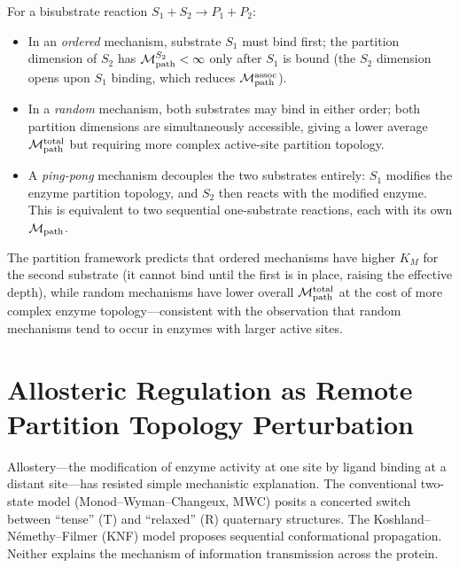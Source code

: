 \begin{proposition}
\label{prop:bibi}
For a bisubstrate reaction $S_1 + S_2 \to P_1 + P_2$:
\begin{itemize}
  \item In an \emph{ordered} mechanism, substrate $S_1$ must bind first;
        the partition dimension of $S_2$ has $\mathcal{M}_{\mathrm{path}}^{S_2} < \infty$
        only after $S_1$ is bound (the $S_2$ dimension opens upon $S_1$
        binding, which reduces $\mathcal{M}_{\mathrm{path}}^{\mathrm{assoc}}$).
  \item In a \emph{random} mechanism, both substrates may bind in either order;
        both partition dimensions are simultaneously accessible, giving a
        lower average $\mathcal{M}_{\mathrm{path}}^{\mathrm{total}}$ but requiring
        more complex active-site partition topology.
  \item A \emph{ping-pong} mechanism decouples the two substrates entirely:
        $S_1$ modifies the enzyme partition topology, and $S_2$ then reacts
        with the modified enzyme. This is equivalent to two sequential
        one-substrate reactions, each with its own $\mathcal{M}_{\mathrm{path}}$.
\end{itemize}
\end{proposition}

The partition framework predicts that ordered mechanisms have higher
$K_M$ for the second substrate (it cannot bind until the first is in place,
raising the effective depth), while random mechanisms have lower overall
$\mathcal{M}_{\mathrm{path}}^{\mathrm{total}}$ at the cost of more complex
enzyme topology---consistent with the observation that random mechanisms
tend to occur in enzymes with larger active sites.

\section{Allosteric Regulation as Remote Partition Topology Perturbation}
\label{sec:allostery}

Allostery---the modification of enzyme activity at one site by ligand
binding at a distant site---has resisted simple mechanistic explanation.
The conventional two-state model (Monod--Wyman--Changeux, MWC) posits a
concerted switch between ``tense'' (T) and ``relaxed'' (R) quaternary
structures. The Koshland--N\'emethy--Filmer (KNF) model proposes sequential
conformational propagation. Neither explains the mechanism of information
transmission across the protein.

